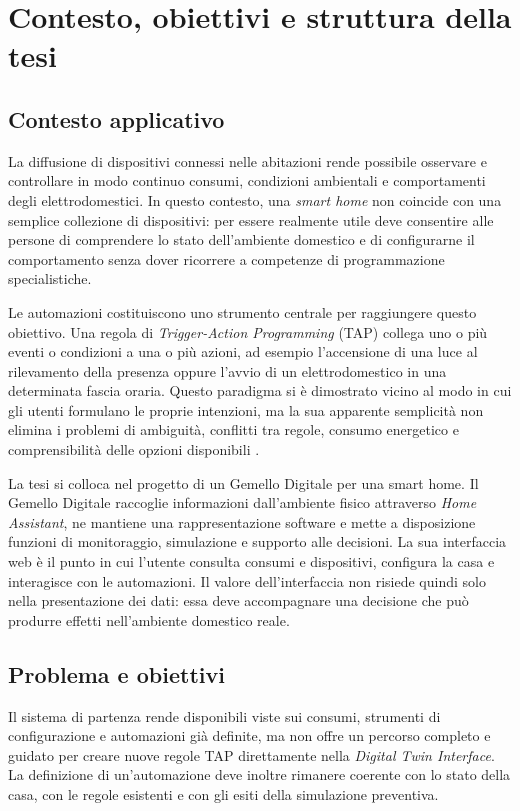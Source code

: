 \chapter{Contesto, obiettivi e struttura della tesi}
\label{chap:contesto-obiettivi}

\section{Contesto applicativo}
La diffusione di dispositivi connessi nelle abitazioni rende possibile osservare e controllare in modo continuo consumi, condizioni ambientali e comportamenti degli elettrodomestici. In questo contesto, una \textit{smart home} non coincide con una semplice collezione di dispositivi: per essere realmente utile deve consentire alle persone di comprendere lo stato dell'ambiente domestico e di configurarne il comportamento senza dover ricorrere a competenze di programmazione specialistiche.

Le automazioni costituiscono uno strumento centrale per raggiungere questo obiettivo. Una regola di \textit{Trigger-Action Programming} (TAP) collega uno o pi\`u eventi o condizioni a una o pi\`u azioni, ad esempio l'accensione di una luce al rilevamento della presenza oppure l'avvio di un elettrodomestico in una determinata fascia oraria. Questo paradigma si \`e dimostrato vicino al modo in cui gli utenti formulano le proprie intenzioni, ma la sua apparente semplicit\`a non elimina i problemi di ambiguit\`a, conflitti tra regole, consumo energetico e comprensibilit\`a delle opzioni disponibili \cite{Ur2014,Barricelli2024}.

La tesi si colloca nel progetto di un Gemello Digitale per una smart home. Il Gemello Digitale raccoglie informazioni dall'ambiente fisico attraverso \textit{Home Assistant}, ne mantiene una rappresentazione software e mette a disposizione funzioni di monitoraggio, simulazione e supporto alle decisioni. La sua interfaccia web \`e il punto in cui l'utente consulta consumi e dispositivi, configura la casa e interagisce con le automazioni. Il valore dell'interfaccia non risiede quindi solo nella presentazione dei dati: essa deve accompagnare una decisione che pu\`o produrre effetti nell'ambiente domestico reale.

\section{Problema e obiettivi}
Il sistema di partenza rende disponibili viste sui consumi, strumenti di configurazione e automazioni gi\`a definite, ma non offre un percorso completo e guidato per creare nuove regole TAP direttamente nella \textit{Digital Twin Interface}. La definizione di un'automazione deve inoltre rimanere coerente con lo stato della casa, con le regole esistenti e con gli esiti della simulazione preventiva.

